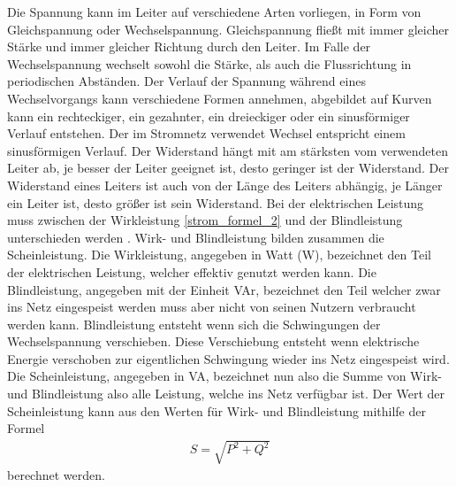 Die Spannung kann im Leiter auf verschiedene Arten vorliegen, in Form von Gleichspannung oder Wechselspannung. Gleichspannung fließt mit immer gleicher Stärke und immer gleicher Richtung durch den Leiter. Im Falle der Wechselspannung wechselt sowohl die Stärke, als auch die Flussrichtung in periodischen Abständen. Der Verlauf der Spannung während eines Wechselvorgangs kann verschiedene Formen annehmen, abgebildet auf Kurven kann ein rechteckiger, ein gezahnter, ein dreieckiger oder ein sinusförmiger Verlauf entstehen. Der im Stromnetz verwendet Wechsel entspricht einem sinusförmigen Verlauf. Der Widerstand hängt mit am stärksten vom verwendeten Leiter ab, je besser der Leiter geeignet ist, desto geringer ist der Widerstand. Der Widerstand eines Leiters ist auch von der Länge des Leiters abhängig, je Länger ein Leiter ist, desto größer ist sein Widerstand. Bei der elektrischen Leistung muss zwischen der Wirkleistung \ref{strom_formel_2} und der Blindleistung unterschieden werden \cite{strom_leistung}. Wirk- und Blindleistung bilden zusammen die Scheinleistung. Die Wirkleistung, angegeben in Watt (W), bezeichnet den Teil der elektrischen Leistung, welcher effektiv genutzt werden kann. Die Blindleistung, angegeben mit der Einheit VAr, bezeichnet den Teil welcher zwar ins Netz eingespeist werden muss aber nicht von seinen Nutzern verbraucht werden kann. Blindleistung entsteht wenn sich die Schwingungen der Wechselspannung verschieben. Diese Verschiebung entsteht wenn elektrische Energie verschoben zur eigentlichen Schwingung wieder ins Netz eingespeist wird. Die Scheinleistung, angegeben in VA, bezeichnet nun also die Summe von Wirk- und Blindleistung also alle Leistung, welche ins Netz verfügbar ist. Der Wert der Scheinleistung kann aus den Werten für Wirk- und Blindleistung mithilfe der Formel
\begin{align}
	S = \sqrt{P^{2}+Q^{2}}
	\label{strom_formel_3}
\end{align}
berechnet werden.

